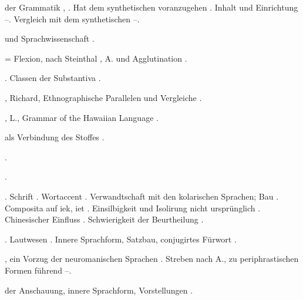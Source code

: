 \begin{register}
 der Grammatik \pageref{sp.85}, \pageref{sp.88}. Hat dem synthetischen voranzugehen \pageref{sp.86}. Inhalt und Einrichtung \pageref{sp.88}–\pageref{sp.93}. Vergleich mit dem synthetischen \pageref{sp.93}–\pageref{sp.94}.

 und Sprachwissenschaft \pageref{sp.15}.

 = Flexion, nach Steinthal \pageref{sp.337}, A. und Agglutination \pageref{sp.351}.

. Classen der Substantiva \pageref{sp.442}.

, Richard, Ethnographische Parallelen und Vergleiche \pageref{sp.148}.

, L., Grammar of the Hawaiian Language \pageref{sp.463}.

 als Verbindung des Stoffes \pageref{sp.324}.


.

.

. Schrift \pageref{sp.129}. Wortaccent \pageref{sp.148}. Verwandtschaft mit den kolarischen Sprachen; Bau \pageref{sp.150}. Composita auf iek, iet \pageref{sp.223}.  Einsilbigkeit und Isolirung nicht ursprünglich \pageref{sp.255}. Chinesischer Einfluss \pageref{sp.271}.  Schwierigkeit der Beurtheilung \pageref{sp.426}. 

. Lautwesen \pageref{sp.34}. Innere Sprachform, Satzbau, conjugirtes Fürwort \pageref{sp.151}. 



, ein Vorzug der neuromanischen Sprachen \pageref{sp.183}.  Streben nach A., zu periphrastischen Formen führend \pageref{sp.239}–\pageref{sp.241}.

 der Anschauung, innere Sprachform, Vorstellungen \pageref{sp.335}.




\end{register}
